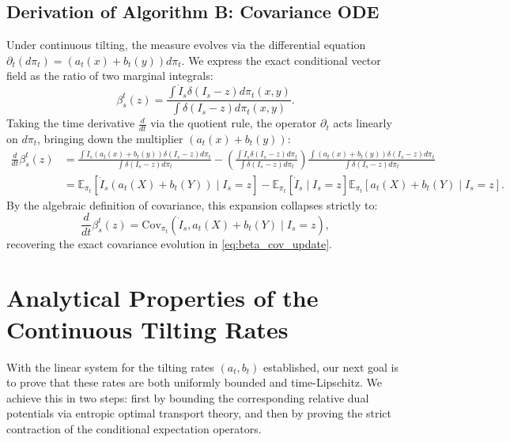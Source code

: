 \documentclass[11pt]{article}
\theoremstyle{definition}
\numberwithin{equation}{section}%
\begin{document}
{\subsection{Derivation of Algorithm B: Covariance ODE}
Under continuous tilting, the measure evolves via the differential equation $\partial_t(d\pi_t) = (a_t(x)+b_t(y)) d\pi_t$. We express the exact conditional vector field as the ratio of two marginal integrals:
\begin{equation*}
    \beta_s^t(z) = \frac{\int \dot{I}_s \delta(I_s - z) d\pi_t(x,y)}{\int \delta(I_s - z) d\pi_t(x,y)}.
\end{equation*}
Taking the time derivative $\frac{d}{dt}$ via the quotient rule, the operator $\partial_t$ acts linearly on $d\pi_t$, bringing down the multiplier $(a_t(x)+b_t(y))$:
\begin{align*}
    \frac{d}{dt}\beta_s^t(z) 
    &= \frac{\int \dot{I}_s (a_t(x) + b_t(y)) \delta(I_s - z) d\pi_t}{\int \delta(I_s - z) d\pi_t} - \left( \frac{\int \dot{I}_s \delta(I_s - z) d\pi_t}{\int \delta(I_s - z) d\pi_t} \right) \frac{\int (a_t(x) + b_t(y)) \delta(I_s - z) d\pi_t}{\int \delta(I_s - z) d\pi_t} \\
    &= \mathbb{E}_{\pi_t}\!\left[\dot{I}_s (a_t(X) + b_t(Y)) \mid I_s=z\right] - \mathbb{E}_{\pi_t}\!\left[\dot{I}_s \mid I_s=z\right] \mathbb{E}_{\pi_t}\!\left[a_t(X) + b_t(Y) \mid I_s=z\right].
\end{align*}
By the algebraic definition of covariance, this expansion collapses strictly to:
\begin{equation}
\label{eq:beta_cov_update}
    \frac{d}{dt}\beta_s^t(z) = \mathrm{Cov}_{\pi_t}\!\left(\dot{I}_s, a_t(X) + b_t(Y) \mid I_s=z\right),
\end{equation}
recovering the exact covariance evolution in \eqref{eq:beta_cov_update}.

\section{Analytical Properties of the Continuous Tilting Rates}
\label{app:analy_titlting_rate}
With the linear system for the tilting rates $(a_t, b_t)$ established, our next goal is to prove that these rates are both uniformly bounded and time-Lipschitz. We achieve this in two steps: first by bounding the corresponding relative dual potentials via entropic optimal transport theory, and then by proving the strict contraction of the conditional expectation operators.

}
\end{document}
